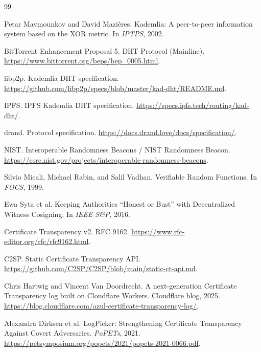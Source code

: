 \documentclass[11pt]{article}
\begin{document}
\begin{thebibliography}{99}\small

Petar Maymounkov and David Mazières.
\newblock Kademlia: A peer-to-peer information system based on the XOR metric.
\newblock In \emph{IPTPS}, 2002.

BitTorrent Enhancement Proposal 5.
\newblock DHT Protocol (Mainline).
\newblock \url{https://www.bittorrent.org/beps/bep_0005.html}.

libp2p.
\newblock Kademlia DHT specification.
\newblock \url{https://github.com/libp2p/specs/blob/master/kad-dht/README.md}.

IPFS.
\newblock IPFS Kademlia DHT specification.
\newblock \url{https://specs.ipfs.tech/routing/kad-dht/}.

drand.
\newblock Protocol specification.
\newblock \url{https://docs.drand.love/docs/specification/}.

NIST.
\newblock Interoperable Randomness Beacons / NIST Randomness Beacon.
\newblock \url{https://csrc.nist.gov/projects/interoperable-randomness-beacons}.

Silvio Micali, Michael Rabin, and Salil Vadhan.
\newblock Verifiable Random Functions.
\newblock In \emph{FOCS}, 1999.

Ewa Syta et al.
\newblock Keeping Authorities ``Honest or Bust'' with Decentralized Witness Cosigning.
\newblock In \emph{IEEE S\&P}, 2016.

Certificate Transparency v2.
\newblock RFC 9162.
\newblock \url{https://www.rfc-editor.org/rfc/rfc9162.html}.

C2SP.
\newblock Static Certificate Transparency API.
\newblock \url{https://github.com/C2SP/C2SP/blob/main/static-ct-api.md}.

Chris Hartwig and Vincent Van Doordrecht.
\newblock A next-generation Certificate Transparency log built on Cloudflare Workers.
\newblock Cloudflare blog, 2025.
\newblock \url{https://blog.cloudflare.com/azul-certificate-transparency-log/}.

Alexandra Dirksen et al.
\newblock LogPicker: Strengthening Certificate Transparency Against Covert Adversaries.
\newblock \emph{PoPETs}, 2021.
\newblock \url{https://petsymposium.org/popets/2021/popets-2021-0066.pdf}.


\end{thebibliography}
\end{document}
